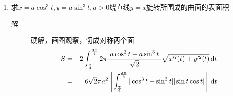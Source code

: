 \begin{enumerate}
\item 求$x=a\cos^3 t,y=a\sin^3 t,a>0$绕直线$y=x$旋转所围成的曲面的表面积
\begin{description}
\item[解] 硬解，画图观察，切成对称两个面
\begin{eqnarray*}
S &= & 2 \int_{\frac{\pi}{4}}^{\frac{3\pi}{4}} 2\pi \frac{|a\cos^3t-a\sin^3t|}{\sqrt{2}}\sqrt{x'^2(t)+y'^2(t)}\,\mathrm{d} t\\
&=&6\sqrt{2}\pi a^2\left[\int_{\frac{\pi}{4}}^{\frac{3\pi}{4}}|\cos^3t-\sin^3t||\sin t\cos t| \right]\,\mathrm{d} t
\end{eqnarray*}
\end{description}


















\end{enumerate}